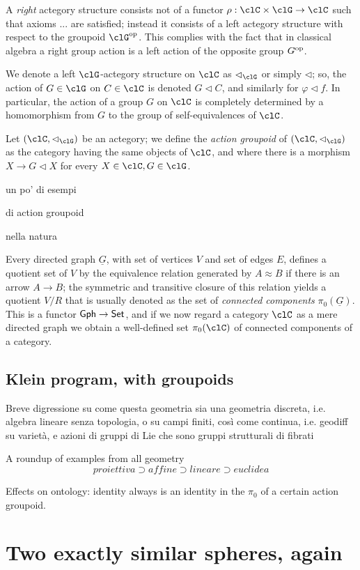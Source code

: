 \documentclass{amsart}
\begin{document}
\begin{remark}
  A \emph{right} actegory structure consists not of a functor $\rho : \clC \times \clG \to \clC$ such that axioms ... are satisfied; instead it consists of a left actegory structure with respect to the groupoid $\clG^\op$. This complies with the fact that in classical algebra a right group action is a left action of the opposite group $G^{\text{op}}$.
\end{remark}
\begin{notation}
  We denote a left $\clG$-actegory structure on $\clC$ as $\lhd_\clG$ or simply $\lhd$; so, the action of $G \in\clG$ on $C \in \clC$ is denoted $G\lhd C$, and similarly for $\varphi\lhd f$. In particular, the action of a group $G$ on $\clC$ is completely determined by a homomorphism from $G$ to the group of self-equivalences of $\clC$.
\end{notation}
\begin{definition}
Let $(\clC,\lhd_\clG)$ be an actegory; we define the \emph{action groupoid} of $(\clC,\lhd_\clG)$ as the category having the same objects of $\clC$, and where there is a morphism $X\to G\lhd X$ for every $X\in\clC, G\in\clG$.
\end{definition}
\begin{example}
un po' di esempi
\end{example}
\begin{example}
di action groupoid
\end{example}
\begin{example}
nella natura
\end{example}
\begin{definition}
Every directed graph $\underline G$, with set of vertices $V$ and set of edges $E$, defines a quotient set of $V$ by the equivalence relation generated by $A\approx B$ if there is an arrow $A\to B$; the symmetric and transitive closure of this relation yields a quotient $V/R$ that is usually denoted as the set of \emph{connected components} $\pi_0(\underline G)$. This is a functor ${\sf Gph} \to \mathsf{Set}$, and if we now regard a category $\clC$ as a mere directed graph we obtain a well-defined set $\pi_0(\clC)$ of connected components of a category.
\end{definition}
\subsection{Klein program, with groupoids}
\begin{remark}
Breve digressione su come questa geometria sia una geometria discreta, i.e. algebra lineare senza topologia, o su campi finiti, così come continua, i.e. geodiff su varietà, e azioni di gruppi di Lie che sono gruppi strutturali di fibrati
\end{remark}
\begin{example}
  A roundup of examples from all geometry
\[proiettiva \supset affine \supset lineare \supset euclidea\]
\end{example}
Effects on ontology: identity always is an identity in the $\pi_0$ of a certain action groupoid.

\section{Two exactly similar spheres, again}
\end{document}
